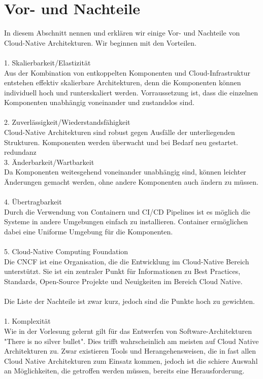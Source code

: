 \section{Vor- und Nachteile}
In diesem Abschnitt nennen und erklären wir einige Vor- und Nachteile von Cloud-Native Architekturen. Wir beginnen mit den Vorteilen.\\
\\
1. Skalierbarkeit/Elastizität\\
Aus der Kombination von entkoppelten Komponenten und Cloud-Infrastruktur entstehen effektiv skalierbare Architekturen, denn die Komponenten können individuell hoch und runterskaliert werden. Vorraussetzung ist, dass die einzelnen Komponenten unabhängig voneinander und zustandslos sind.\\
\\
2. Zuverlässigkeit/Wiederstandsfähigkeit\\
Cloud-Native Architekturen sind robust gegen Ausfälle der unterliegenden Strukturen. Komponenten werden überwacht und bei Bedarf neu gestartet.\\
redundanz
\\
3. Änderbarkeit/Wartbarkeit\\
Da Komponenten weitesgehend voneinander unabhängig sind, können leichter Änderungen gemacht werden, ohne andere Komponenten auch ändern zu müssen.\\
\\
4. Übertragbarkeit\\
Durch die Verwendung von Containern und CI/CD Pipelines ist es möglich die Systeme in andere Umgebungen einfach zu installieren. Container ermöglichen dabei eine Uniforme Umgebung für die Komponenten.\\
\\
5. Cloud-Native Computing Foundation\\
Die CNCF ist eine Organisation, die die Entwicklung im Cloud-Native Bereich unterstützt. Sie ist ein zentraler Punkt für Informationen zu Best Practices, Standards, Open-Source Projekte und Neuigkeiten im Bereich Cloud Native.\\
\\
Die Liste der Nachteile ist zwar kurz, jedoch sind die Punkte hoch zu gewichten.\\
\\
1. Komplexität\\
Wie in der Vorlesung gelernt gilt für das Entwerfen von Software-Architekturen "There is no silver bullet". Dies trifft wahrscheinlich am meisten auf Cloud Native Architekturen zu. Zwar existieren Tools und Herangehensweisen, die in fast allen Cloud Native Architekturen zum Einsatz kommen, jedoch ist die schiere Auswahl an Möglichkeiten, die getroffen werden müssen, bereits eine Herausforderung. 
